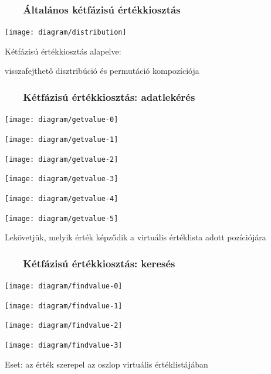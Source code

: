 \documentclass[
]{beamer}
\newcommand{\slidetitle}[2]{\frametitle{{\small #1 ~ \ding{226} ~ } \normalsize \textbf{#2} }}
\begin{document}
\begin{frame}
    \slidetitle{\sectionshorttitle}{Általános kétfázisú értékkiosztás}
    
    \centering
    
    \texttt{[image: diagram/distribution]}
    
    Kétfázisú értékkiosztás alapelve: \par
    visszafejthető disztribúció és permutáció kompozíciója
\end{frame}

\begin{frame}
    \slidetitle{\sectionshorttitle}{Kétfázisú értékkiosztás: adatlekérés}
    
    \centering
    
    \begin{overprint}
        \centerline{\texttt{[image: diagram/getvalue-0]}}
        \centerline{\texttt{[image: diagram/getvalue-1]}}
        \centerline{\texttt{[image: diagram/getvalue-2]}}
        \centerline{\texttt{[image: diagram/getvalue-3]}}
        \centerline{\texttt{[image: diagram/getvalue-4]}}
        \centerline{\texttt{[image: diagram/getvalue-5]}}
    \end{overprint}
    
    \hspace{0.7cm}
    
    Lekövetjük, melyik érték képződik a virtuális értéklista adott pozíciójára
\end{frame}

\begin{frame}
    \slidetitle{\sectionshorttitle}{Kétfázisú értékkiosztás: keresés}
    
    \centering
    
    \begin{overprint}
        \centerline{\texttt{[image: diagram/findvalue-0]}}
        \centerline{\texttt{[image: diagram/findvalue-1]}}
        \centerline{\texttt{[image: diagram/findvalue-2]}}
        \centerline{\texttt{[image: diagram/findvalue-3]}}
    \end{overprint}
    
    \vspace{0.7cm}
    
    Eset: az érték szerepel az oszlop virtuális értéklistájában
\end{frame}
\end{document}
